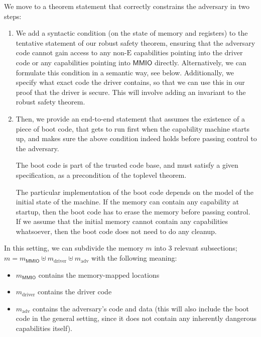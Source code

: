 \documentclass{article}
\newcommand{\X}[1]{\ensuremath{\mathrm{#1}}}
\newcommand{\Sf}[1]{\ensuremath{\mathsf{#1}}}
\newcommand{\MMIO}{\Sf{MMIO}\xspace}
\begin{document}
We move to a theorem statement that correctly constrains the adversary in two
steps:
%
\begin{enumerate}
  \item We add a syntactic condition (on the state of memory and registers) to
    the tentative statement of our robust safety theorem, ensuring that the
    adversary code cannot gain access to any non-$\X{E}$ capabilities pointing into
    the driver code or any capabilities pointing into $\MMIO$ directly.
    Alternatively, we can formulate this condition in a semantic way, see below.
    Additionally, we specify what exact code the driver contains, so that we can
    use this in our proof that the driver is secure. This will involve adding an
    invariant to the robust safety theorem.
%
  \item Then, we provide an end-to-end statement that assumes the existence of a
    piece of boot code, that gets to run first when the capability machine
    starts up, and makes sure the above condition indeed holds before passing
    control to the adversary.

    The boot code is part of the trusted code base, and must satisfy a given
    specification, as a precondition of the toplevel theorem.

    The particular implementation of the boot code depends on the model of the
    initial state of the machine. If the memory can contain any capability at
    startup, then the boot code has to erase the memory before passing control.
    If we assume that the initial memory cannot contain any capabilities
    whatsoever, then the boot code does not need to do any cleanup.
\end{enumerate}

In this setting, we can subdivide the memory $m$ into 3 relevant subsections;
$m = m_{\MMIO} \uplus m_{\X{driver}} \uplus m_{\X{adv}}$ %
with the following meaning:
\begin{itemize}
\item $m_{\MMIO}$ contains the memory-mapped locations
\item $m_{\X{driver}}$ contains the driver code
\item  $m_{\X{adv}}$ contains the adversary's code and data (this will also
  include the boot code in the general setting, since it does not contain any
  inherently dangerous capabilities itself).
\end{itemize}

\newcommand{\nonCap}[1]{\ensuremath{\mathrm{nonCap}(#1)}}
\end{document}
